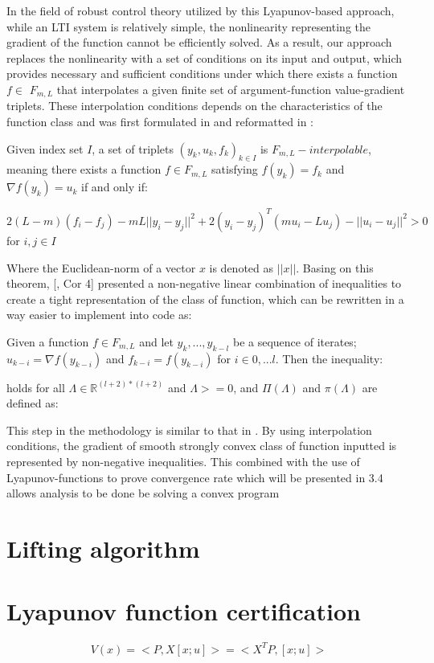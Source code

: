 In the field of robust control theory utilized by this Lyapunov-based approach, while an LTI system is relatively simple, the nonlinearity representing the gradient of the function cannot be efficiently solved. As a result, our approach replaces the nonlinearity with a set of conditions on its input and output, which provides necessary and sufficient conditions under which there exists a function \(f \in \) \(F_{m,L}\) that interpolates a given finite set of argument-function value-gradient triplets. These interpolation conditions depends on the characteristics of the function class and was first formulated in \cite{taylor2016} and reformatted in \cite{tutorial}:

\begin{theorem}
	\label{thm:interpolation_condition}
	Given index set \(I\), a set of triplets \({(y_k, u_k, f_k)}_{k \in I}\) is \(F_{m,L}-interpolable\), meaning there exists a function \(f \in F_{m,L}\) satisfying \(f(y_k) = f_k\) and \(\nabla f(y_k) = u_k\) if and only if:

	\(2(L-m)(f_i - f_j) - mL||y_i - y_j||^2 + 2(y_i - y_j)^{T}(mu_i - Lu_j) - ||u_i - u_j||^2 > 0\) for \(i ,j \in I\)

\end{theorem}

Where the Euclidean-norm of a vector \(x\) is denoted as \(||x||\). Basing on this theorem, [\cite{tutorial}, Cor 4] presented a non-negative linear combination of inequalities to create a tight representation of the class of function, which can be rewritten in a way easier to implement into code as:

\begin{corollary}
	Given a function \(f \in F_{m,L}\) and let \(y_k,...,y_{k-l}\) be a sequence of iterates; \(u_{k-i} = \nabla f(y_{k-i})\) and \(f_{k-i} = f(y_{k-i})\) for \(i \in 0,...l\). Then the inequality:
	
	holds for all \(\Lambda \in \mathbb{R}^{(l+2) * (l+2)}\) and \(\Lambda >= 0\), and \(\Pi(\Lambda)\) and  \(\pi(\Lambda)\) are defined as:

\end{corollary}

This step in the methodology is similar to that in \cite{pepit}. By using interpolation conditions, the gradient of smooth strongly convex class of function inputted is represented by non-negative inequalities. This combined with the use of Lyapunov-functions to prove convergence rate which will be presented in 3.4 allows analysis to be done be solving a convex program

\section{Lifting algorithm}

\section{Lyapunov function certification}
\begin{equation} \label{eqn:Lyapunov}
	V(x) = <P, X[x; u]> = <X^T P, [x; u]>
\end{equation}

